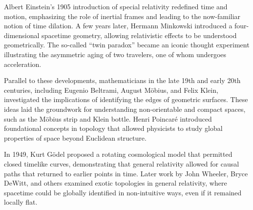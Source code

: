 \begin{historical}
Albert Einstein’s 1905 introduction of special relativity redefined time and motion, emphasizing the role of inertial frames and leading to the now-familiar notion of time dilation. A few years later, Hermann Minkowski introduced a four-dimensional spacetime geometry, allowing relativistic effects to be understood geometrically. The so-called “twin paradox” became an iconic thought experiment illustrating the asymmetric aging of two travelers, one of whom undergoes acceleration.

Parallel to these developments, mathematicians in the late 19th and early 20th centuries, including Eugenio Beltrami, August Möbius, and Felix Klein, investigated the implications of identifying the edges of geometric surfaces. These ideas laid the groundwork for understanding non-orientable and compact spaces, such as the Möbius strip and Klein bottle. Henri Poincaré introduced foundational concepts in topology that allowed physicists to study global properties of space beyond Euclidean structure.

In 1949, Kurt Gödel proposed a rotating cosmological model that permitted closed timelike curves, demonstrating that general relativity allowed for causal paths that returned to earlier points in time. Later work by John Wheeler, Bryce DeWitt, and others examined exotic topologies in general relativity, where spacetime could be globally identified in non-intuitive ways, even if it remained locally flat.
\end{historical}
